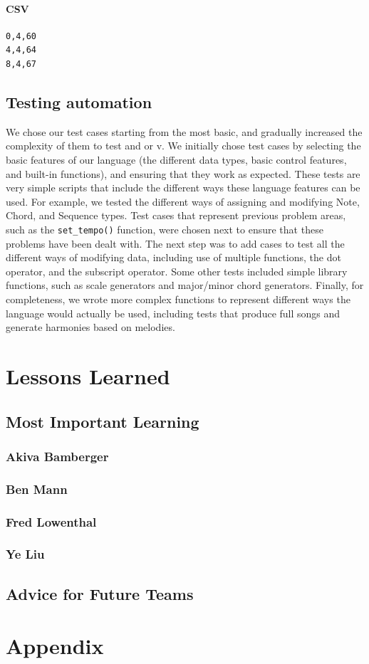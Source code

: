 \documentclass[12pt,A4]{book}
\begin{document}
\subsubsection{CSV}
\begin{verbatim}
0,4,60
4,4,64
8,4,67
\end{verbatim}

\section{Testing automation}
We chose our test cases starting from the most basic, and gradually increased the complexity of them to test and or v.  We initially chose test cases by selecting the basic features of our language (the different data types, basic control features, and built-in functions), and ensuring that they work as expected.  These tests are very simple scripts that include the different ways these language features can be used. For example, we tested the different ways of assigning and modifying Note, Chord, and Sequence types. Test cases that represent previous problem areas, such as the \verb|set_tempo()| function, were chosen next to ensure that these problems have been dealt with.  The next step was to add cases to test all the different ways of modifying data, including use of multiple functions, the dot operator, and the subscript operator.  Some other tests included simple library functions, such as scale generators and major/minor chord generators.  Finally, for completeness, we wrote more complex functions to represent different ways the language would actually be used, including tests that produce full songs and generate harmonies based on melodies.

\chapter{Lessons Learned}
\section{Most Important Learning}
\subsection{Akiva Bamberger}
\subsection{Ben Mann}
\subsection{Fred Lowenthal}
\subsection{Ye Liu}
\section{Advice for Future Teams}
\chapter{Appendix}
\end{document}
